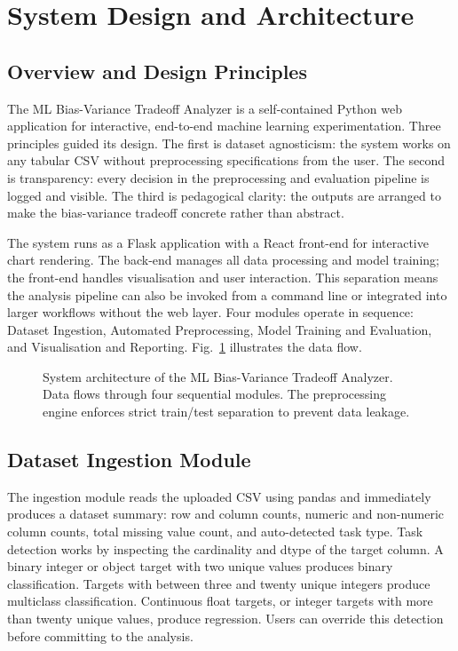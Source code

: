 \documentclass[conference]{IEEEtran}
\begin{document}
\section{System Design and Architecture}

\subsection{Overview and Design Principles}

The ML Bias-Variance Tradeoff Analyzer is a self-contained Python web application for interactive, end-to-end machine learning experimentation. Three principles guided its design. The first is dataset agnosticism: the system works on any tabular CSV without preprocessing specifications from the user. The second is transparency: every decision in the preprocessing and evaluation pipeline is logged and visible. The third is pedagogical clarity: the outputs are arranged to make the bias-variance tradeoff concrete rather than abstract.

The system runs as a Flask application with a React front-end for interactive chart rendering. The back-end manages all data processing and model training; the front-end handles visualisation and user interaction. This separation means the analysis pipeline can also be invoked from a command line or integrated into larger workflows without the web layer. Four modules operate in sequence: Dataset Ingestion, Automated Preprocessing, Model Training and Evaluation, and Visualisation and Reporting. Fig.~\ref{fig:architecture} illustrates the data flow.

\begin{figure}[t]
    \centering
    \caption{System architecture of the ML Bias-Variance Tradeoff Analyzer. Data flows through four sequential modules. The preprocessing engine enforces strict train/test separation to prevent data leakage.}
    \label{fig:architecture}
\end{figure}

\subsection{Dataset Ingestion Module}

The ingestion module reads the uploaded CSV using pandas and immediately produces a dataset summary: row and column counts, numeric and non-numeric column counts, total missing value count, and auto-detected task type. Task detection works by inspecting the cardinality and dtype of the target column. A binary integer or object target with two unique values produces binary classification. Targets with between three and twenty unique integers produce multiclass classification. Continuous float targets, or integer targets with more than twenty unique values, produce regression. Users can override this detection before committing to the analysis.
\end{document}

